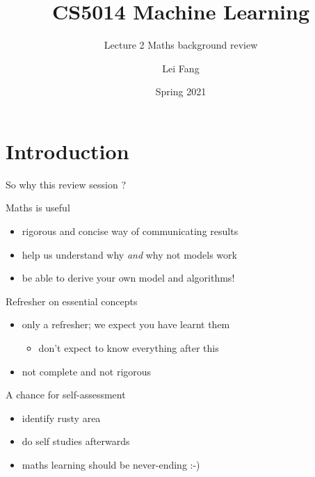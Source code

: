 \documentclass[ignorenonframetext,]{beamer}
\title{CS5014 Machine Learning}
\subtitle{Lecture 2 Maths background review}
\author{Lei Fang}
\date{Spring 2021}
\providecommand{\tightlist}{%
  \setlength{\itemsep}{0pt}\setlength{\parskip}{0pt}}
\begin{document}
\frame{\titlepage}

\hypertarget{introduction}{%
\section{Introduction}\label{introduction}}

\begin{frame}{So why this review session ?}
\protect\hypertarget{so-why-this-review-session}{}

Maths is useful

\begin{itemize}
\tightlist
\item
  rigorous and concise way of communicating results
\item
  help us understand why \emph{and} why not models work
\item
  be able to derive your own model and algorithms!
\end{itemize}

\pause 
\bigskip

Refresher on essential concepts

\begin{itemize}
\tightlist
\item
  only a refresher; we expect you have learnt them

  \begin{itemize}
  \tightlist
  \item
    don't expect to know everything after this
  \end{itemize}
\item
  not complete and not rigorous
\end{itemize}

\pause

\bigskip A chance for self-assessment

\begin{itemize}
\tightlist
\item
  identify rusty area
\item
  do self studies afterwards
\item
  maths learning should be never-ending :-)
\end{itemize}

\end{frame}
\end{document}
